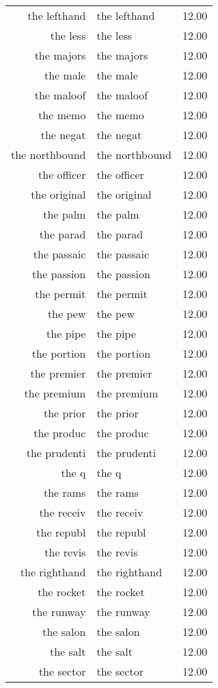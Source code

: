 \begin{table}[ht]
\begin{tabular}{rlr}
  the lefthand & the lefthand & 12.00 \\ 
  the less & the less & 12.00 \\ 
  the majors & the majors & 12.00 \\ 
  the male & the male & 12.00 \\ 
  the maloof & the maloof & 12.00 \\ 
  the memo & the memo & 12.00 \\ 
  the negat & the negat & 12.00 \\ 
  the northbound & the northbound & 12.00 \\ 
  the officer & the officer & 12.00 \\ 
  the original & the original & 12.00 \\ 
  the palm & the palm & 12.00 \\ 
  the parad & the parad & 12.00 \\ 
  the passaic & the passaic & 12.00 \\ 
  the passion & the passion & 12.00 \\ 
  the permit & the permit & 12.00 \\ 
  the pew & the pew & 12.00 \\ 
  the pipe & the pipe & 12.00 \\ 
  the portion & the portion & 12.00 \\ 
  the premier & the premier & 12.00 \\ 
  the premium & the premium & 12.00 \\ 
  the prior & the prior & 12.00 \\ 
  the produc & the produc & 12.00 \\ 
  the prudenti & the prudenti & 12.00 \\ 
  the q & the q & 12.00 \\ 
  the rams & the rams & 12.00 \\ 
  the receiv & the receiv & 12.00 \\ 
  the republ & the republ & 12.00 \\ 
  the revis & the revis & 12.00 \\ 
  the righthand & the righthand & 12.00 \\ 
  the rocket & the rocket & 12.00 \\ 
  the runway & the runway & 12.00 \\ 
  the salon & the salon & 12.00 \\ 
  the salt & the salt & 12.00 \\ 
  the sector & the sector & 12.00 \\ 

\end{tabular}
\end{table}
